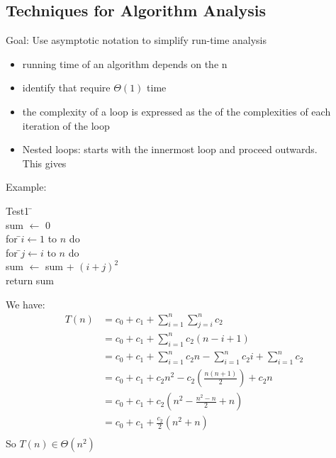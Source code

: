 \documentclass[letterpaper, 12pt]{article}
\newcommand{\red}[1]{{\color{red}{#1}}}
\begin{document}
    \subsection{Techniques for Algorithm Analysis}
    Goal: Use asymptotic notation to simplify run-time analysis\\
    \begin{itemize}
        \item running time of an algorithm depends on the \red{input size} n
        \item identify \red{elementary operations} that require $\Theta(1)$ time
        \item the complexity of a loop is expressed as the \red{sum} of the complexities of each iteration of the loop
        \item Nested loops: starts with the innermost loop and proceed outwards.\\
        This gives \red{nested summations}
    \end{itemize}
    \bigskip
    Example:\\
    \begin{tabbing}
        Test1 \= \+\\
            sum $\leftarrow$ 0\\
            for \=$i \leftarrow 1$ to $n$ do\\
                \>for \=$j\leftarrow i$ to $n$ do\\
                    \>\>sum $\leftarrow$ sum + $(i + j)^2$\\
            return sum
    \end{tabbing}
    We have:
    \begin{align*}
        T(n) &= c_0 + c_1 + \sum_{i = 1}^n \sum_{j = i}^n c_2\\
        &= c_0 + c_1 + \sum_{i = 1}^n c_2(n - i + 1)\\
        &= c_0 + c_1 + \sum_{i = 1}^n c_2n - \sum_{i = 1}^n c_2i + \sum_{i = 1}^n c_2\\
        &= c_0 + c_1 + c_2n^2 - c_2(\frac{n(n + 1)}{2}) + c_2n\\
        &= c_0 + c_1 + c_2(n^2 - \frac{n^2 - n}{2} + n)\\
        &= c_0 + c_1 + \frac{c_2}{2}(n^2 + n)\\
    \end{align*}
    So $T(n) \in \Theta (n^2)$\\
    \pagebreak
\end{document}
